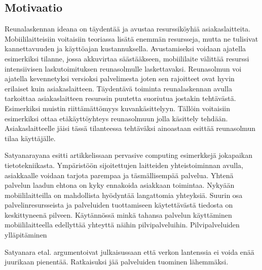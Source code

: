 \documentclass[finnish]{tktltiki2}
\theoremstyle{definition}
\theoremstyle{remark}
\begin{document}
\subsection{Motivaatio}
Reunalaskennan ideana on täydentää ja avustaa resurssiköyhiä asiakaslaitteita. Mobiililaitteisiin voitaisiin teoriassa lisätä enemmän resursseja, mutta ne tulisivat kannettavuuden ja käyttöajan kustannuksella. 
Avustamiseksi voidaan ajatella esimerkiksi tilanne, jossa akkuvirtaa säästääkseen, mobiililaite välittää resurssi intensiivisen laskutoimituksen reunasolmulle laskettavaksi. Reunasolmun voi ajatella kevennetyksi versioksi palvelimesta joten sen rajoitteet ovat hyvin erilaiset kuin asiakaslaitteen.
Täydentävä toiminta reunalaskennan avulla tarkoittaa asiakaslaitteen resurssin puutetta suoriutua jostakin tehtävästä. Esimerkiksi muistin riittämättömyys kuvankäsittelyyn. Tällöin voitaisiin esimerkiksi ottaa etäkäyttöyhteys reunasolmuun jolla käsittely tehdään. Asiakaslaitteelle jäisi tässä tilanteessa tehtäväksi ainoastaan esittää reunasolmun tilaa käyttäjälle.


Satyanarayana \cite{RefWorks:doc:5a65a2cee4b0cb152cfb50e7} esitti artikkelissaan pervasive computing esimerkkejä jokapaikan tietotekniikasta. Ympäristöön sijoitettujen laitteiden yhteistoiminnan avulla, asiakkaalle voidaan tarjota parempaa ja täsmällisempää palvelua. Yhtenä palvelun laadun ehtona on kyky ennakoida asiakkaan toimintaa.
Nykyään mobiililaitteilla on mahdollista hyödyntää langattomia yhteyksiä.
Suurin osa palvelinresursseista ja palveluiden tuottamiseen käytettävästä tiedosta  on keskittyneenä pilveen. Käytännössä minkä tahansa palvelun käyttäminen mobiililaitteella edellyttää yhteyttä näihin pilvipalveluihin. Pilvipalveluiden ylläpitäminen  

 Satyanara etal. argumentoivat julkaisussaan että verkon lantenssia ei voida enää juurikaan pienentää. Ratkaisuksi jää palveluiden tuominen lähemmäksi.
\end{document}
